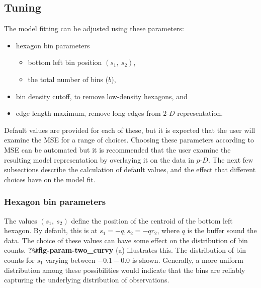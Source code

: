 \documentclass[
  12pt]{article}
\providecommand{\tightlist}{%
  \setlength{\itemsep}{0pt}\setlength{\parskip}{0pt}}\usepackage{longtable,booktabs,array}
\def\tightlist{}
\newcommand\pD{$p\text{-}D$}
\newcommand\gD{$2\text{-}D$}
\begin{document}
\subsection{Tuning}\label{tuning}

The model fitting can be adjusted using these parameters:

\begin{itemize}
\tightlist
\item
  hexagon bin parameters

  \begin{itemize}
  \tightlist
  \item
    bottom left bin position \((s_1, \ s_2)\),
  \item
    the total number of bins (\(b\)),
  \end{itemize}
\item
  bin density cutoff, to remove low-density hexagons, and
\item
  edge length maximum, remove long edges from \gD{} representation.
\end{itemize}

Default values are provided for each of these, but it is expected that
the user will examine the MSE for a range of choices. Choosing these
parameters according to MSE can be automated but it is recommended that
the user examine the resulting model representation by overlaying it on
the data in \pD{}. The next few subsections describe the calculation of
default values, and the effect that different choices have on the model
fit.

\subsubsection{Hexagon bin parameters}\label{hexagon-bin-parameters}

The values \((s_1, \ s_2)\) define the position of the centroid of the
bottom left hexagon. By default, this is at \(s_1 = -q, s_2 = -qr_2\),
where \(q\) is the buffer sound the data. The choice of these values can
have some effect on the distribution of bin counts.
\textbf{?@fig-param-two\_curvy} (a) illustrates this. The distribution
of bin counts for \(s_1\) varying between \(-0.1-0.0\) is shown.
Generally, a more uniform distribution among these possibilities would
indicate that the bins are reliably capturing the underlying
distribution of observations.
\end{document}
